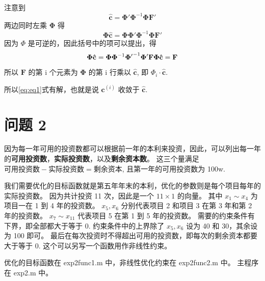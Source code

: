 \documentclass[11pt]{ctexart}
\begin{document}
    注意到 \[\mathbf{\hat{c}}=\mathbf{\Phi'\Phi}^{-1}\mathbf{\Phi F'}\]
    两边同时左乘 \(\mathbf{\Phi}\) 得
    \[\mathbf{\Phi}\mathbf{\hat{c}}=\mathbf{\Phi}\mathbf{\Phi'\Phi}^{-1}\mathbf{\Phi F'}\]
    因为 \(\Phi\) 是可逆的，因此括号中的项可以提出，得
    \[\mathbf{\Phi}\mathbf{\hat{c}}=\mathbf{\Phi}\mathbf{\Phi}^{-1}\mathbf{\Phi'}^{-1}\mathbf{\Phi' F}\\
    \mathbf{\Phi}\mathbf{\hat{c}}=\mathbf{F}\]
    所以 \(\mathbf{F}\) 的第 i 个元素为 \(\mathbf{\Phi}\) 的第 i 行乘以 \(\mathbf{\hat{c}}\), 即 \(\Phi_i \cdot \mathbf{\hat{c}}\).

    所以\eqref{eq:eq1}式有解，也就是说 \(\mathbf{c}^{(i)}\) 收敛于 \(\mathbf{\hat{c}}\).


    \section{问题 2}
    因为每一年可用的投资数都可以根据前一年的本利来投资，因此，可以列出每一年的\textbf{可用投资数}，\textbf{实际投资数}，以及\textbf{剩余资本数}。
    这三个量满足 \(\textbf{可用投资数}-\textbf{实际投资数}=\textbf{剩余资本}\), 且第一年的可用投资数为 100w.

    我们需要优化的目标函数就是第五年年末的本利，优化的参数则是每个项目每年的实际投资数。
    因为共计投资 11 次，因此是一个 \(11\times 1\) 的向量。
    其中 \(x_1 \sim x_4\) 为项目一在 1 到 4 年的投资数。
    \(x_5,x_6\) 分别代表项目 2 和项目 3 在第 3 年和第 2 年的投资数。
    \(x_7\sim x_{11}\) 代表项目 5 在第 1 到 5 年的投资数。
    需要的约束条件有下界，即全部都大于等于 0.
    约束条件中的上界除了 \(x_5,x_6\) 设为 40 和 30，其余设为 100 即可。
    最后在每次投资时不得超出可用的投资数，即每次的剩余资本都要大于等于 0.
    这个可以另写一个函数用作非线性约束。

    优化的目标函数在 exp2func1.m 中，非线性优化约束在 exp2func2.m 中。
    主程序在 exp2.m 中。
\end{document}
